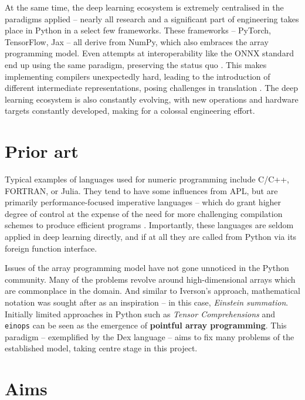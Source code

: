 At the same time, the deep learning ecosystem is extremely centralised in the paradigms applied -- nearly all research and a significant part of engineering takes place in Python in a select few frameworks. These frameworks -- PyTorch, TensorFlow, Jax -- all derive from NumPy, which also embraces the array programming model. Even attempts at interoperability like the ONNX standard end up using the same paradigm, preserving the status quo \cite{jin2020compiling}. This makes implementing compilers unexpectedly hard, leading to the introduction of different intermediate representations, posing challenges in translation \cite{feng2023tensorir}. The deep learning ecosystem is also constantly evolving, with new operations and hardware targets constantly developed, making for a colossal engineering effort.

\newpage
\section{Prior art}

Typical examples of languages used for numeric programming include C/C++, FORTRAN, or Julia. They tend to have some influences from APL, but are primarily performance-focused imperative languages -- which do grant higher degree of control at the expense of the need for more challenging compilation schemes to produce efficient programs \cite{grosser2012polly}. Importantly, these languages are seldom applied in deep learning directly, and if at all they are called from Python via its foreign function interface.

Issues of the array programming model have not gone unnoticed in the Python community. Many of the problems revolve around high-dimensional arrays which are commonplace in the domain. And similar to Iverson's approach, mathematical notation was sought after as an inspiration -- in this case, \textit{Einstein summation}. Initially limited approaches in Python such as \textit{Tensor Comprehensions} \cite{vasilache2018tensor} and \texttt{einops} \cite{rogozhnikov2021einops} can be seen as the emergence of \textbf{pointful array programming}. This paradigm -- exemplified by the Dex language \cite{paszke2021getting} -- aims to fix many problems of the established model, taking centre stage in this project. 

\section{Aims}

